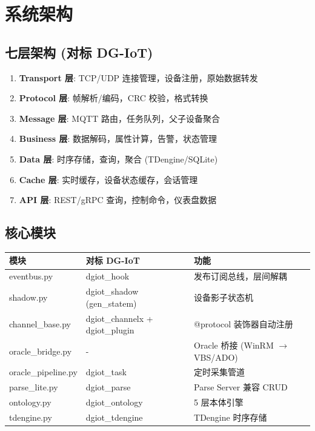 \documentclass[12pt,a4paper]{ctexart}
\begin{document}
\section{系统架构}

\subsection{七层架构 (对标 DG-IoT)}

\begin{enumerate}[leftmargin=*]
  \item \textbf{Transport 层}: TCP/UDP 连接管理，设备注册，原始数据转发
  \item \textbf{Protocol 层}: 帧解析/编码，CRC 校验，格式转换
  \item \textbf{Message 层}: MQTT 路由，任务队列，父子设备聚合
  \item \textbf{Business 层}: 数据解码，属性计算，告警，状态管理
  \item \textbf{Data 层}: 时序存储，查询，聚合 (TDengine/SQLite)
  \item \textbf{Cache 层}: 实时缓存，设备状态缓存，会话管理
  \item \textbf{API 层}: REST/gRPC 查询，控制命令，仪表盘数据
\end{enumerate}

\subsection{核心模块}

\begin{longtable}{p{3.5cm}p{4cm}p{5cm}}
\toprule
\textbf{模块} & \textbf{对标 DG-IoT} & \textbf{功能} \\
\midrule
eventbus.py & dgiot\_hook & 发布订阅总线，层间解耦 \\
shadow.py & dgiot\_shadow (gen\_statem) & 设备影子状态机 \\
channel\_base.py & dgiot\_channelx + dgiot\_plugin & @protocol 装饰器自动注册 \\
oracle\_bridge.py & - & Oracle 桥接 (WinRM $\rightarrow$ VBS/ADO) \\
oracle\_pipeline.py & dgiot\_task & 定时采集管道 \\
parse\_lite.py & dgiot\_parse & Parse Server 兼容 CRUD \\
ontology.py & dgiot\_ontology & 5 层本体引擎 \\
tdengine.py & dgiot\_tdengine & TDengine 时序存储 \\
\bottomrule
\end{longtable}
\end{document}
